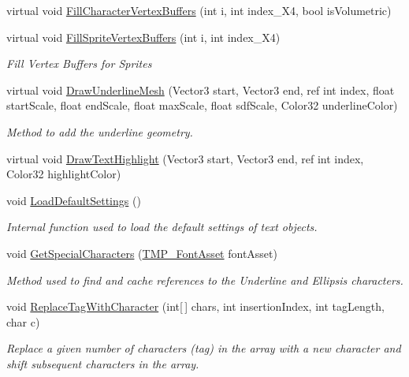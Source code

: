 \begin{DoxyCompactItemize}
virtual void \mbox{\hyperlink{class_t_m_pro_1_1_t_m_p___text_a9374a227d32695c369007d7ae7f19683}{Fill\+Character\+Vertex\+Buffers}} (int i, int index\+\_\+\+X4, bool is\+Volumetric)
\item 
virtual void \mbox{\hyperlink{class_t_m_pro_1_1_t_m_p___text_a6f919375c12a3e03f3ded228043e9513}{Fill\+Sprite\+Vertex\+Buffers}} (int i, int index\+\_\+\+X4)
\begin{DoxyCompactList}\small\item\em Fill Vertex Buffers for Sprites \end{DoxyCompactList}\item 
virtual void \mbox{\hyperlink{class_t_m_pro_1_1_t_m_p___text_a735c1a7bbfc899272bc80bb9175720cc}{Draw\+Underline\+Mesh}} (Vector3 start, Vector3 end, ref int index, float start\+Scale, float end\+Scale, float max\+Scale, float sdf\+Scale, Color32 underline\+Color)
\begin{DoxyCompactList}\small\item\em Method to add the underline geometry. \end{DoxyCompactList}\item 
virtual void \mbox{\hyperlink{class_t_m_pro_1_1_t_m_p___text_a5680800af216e0d2bc6022a4d6ade40b}{Draw\+Text\+Highlight}} (Vector3 start, Vector3 end, ref int index, Color32 highlight\+Color)
\item 
void \mbox{\hyperlink{class_t_m_pro_1_1_t_m_p___text_a4828101c6dd0459b8879cc13d9405e35}{Load\+Default\+Settings}} ()
\begin{DoxyCompactList}\small\item\em Internal function used to load the default settings of text objects. \end{DoxyCompactList}\item 
void \mbox{\hyperlink{class_t_m_pro_1_1_t_m_p___text_a17ad19c4cf9c5ad4485b208eb0a37bf2}{Get\+Special\+Characters}} (\mbox{\hyperlink{class_t_m_pro_1_1_t_m_p___font_asset}{T\+M\+P\+\_\+\+Font\+Asset}} font\+Asset)
\begin{DoxyCompactList}\small\item\em Method used to find and cache references to the Underline and Ellipsis characters. \end{DoxyCompactList}\item 
void \mbox{\hyperlink{class_t_m_pro_1_1_t_m_p___text_aff29421747c4ff78a5d345bf7f35cb88}{Replace\+Tag\+With\+Character}} (int\mbox{[}$\,$\mbox{]} chars, int insertion\+Index, int tag\+Length, char c)
\begin{DoxyCompactList}\small\item\em Replace a given number of characters (tag) in the array with a new character and shift subsequent characters in the array. \end{DoxyCompactList}\item 

\end{DoxyCompactItemize}

